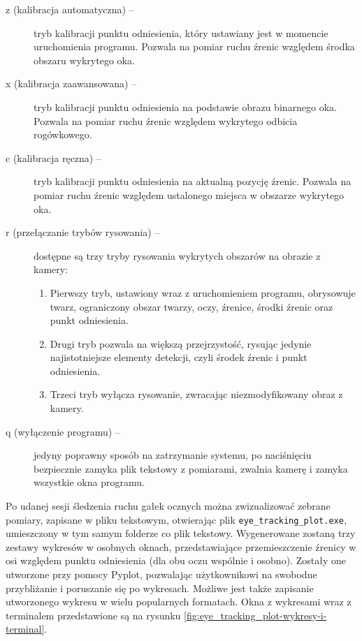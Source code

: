 \documentclass[a4paper,twoside,12pt]{book}
\begin{document}
\begin{description}
	\item[z (kalibracja automatyczna) --]  tryb kalibracji punktu odniesienia, który ustawiany jest w momencie uruchomienia programu. Pozwala na pomiar ruchu źrenic względem środka obszaru wykrytego oka.
	\item[x (kalibracja zaawansowana) --]  tryb kalibracji punktu odniesienia na podstawie obrazu binarnego oka. Pozwala na pomiar ruchu źrenic względem wykrytego odbicia rogówkowego.
	\item[c (kalibracja ręczna) --]  tryb kalibracji punktu odniesienia na aktualną pozycję źrenic. Pozwala na pomiar ruchu źrenic względem ustalonego miejsca w obszarze wykrytego oka.
	\item[r (przełączanie trybów rysowania) --] dostępne są trzy tryby rysowania wykrytych obszarów na obrazie z kamery:
	\begin{enumerate}
		\item Pierwszy tryb, ustawiony wraz z uruchomieniem programu, obrysowuje twarz, ograniczony obszar twarzy, oczy, źrenice, środki źrenic oraz punkt odniesienia.
		\item Drugi tryb pozwala na większą przejrzystość, rysując jedynie najistotniejsze elementy detekcji, czyli środek źrenic i punkt odniesienia.
		\item Trzeci tryb wyłącza rysowanie, zwracając niezmodyfikowany obraz z kamery.
	\end{enumerate}
	\item[q (wyłączenie programu) --] jedyny poprawny sposób na zatrzymanie systemu, po naciśnięciu bezpiecznie zamyka plik tekstowy z pomiarami, zwalnia kamerę i zamyka wszystkie okna programu.
\end{description}

Po udanej sesji śledzenia ruchu gałek ocznych można zwizualizować zebrane pomiary, zapisane w pliku tekstowym, otwierając plik \texttt{eye\_\-tracking\_\-plot.exe},  umieszczony w tym
samym folderze co plik tekstowy. Wygenerowane zostaną trzy zestawy wykresów w osobnych
oknach, przedstawiające przemieszczenie źrenicy w osi względem punktu odniesienia
(dla obu oczu wspólnie i osobno). Zostały one utworzone przy pomocy Pyplot, pozwalając
użytkownikowi na swobodne przybliżanie i poruszanie się po wykresach. Możliwe
jest także zapisanie utworzonego wykresu w wielu popularnych formatach. Okna z
wykresami wraz z terminalem przedstawione są na rysunku \ref{fig:eye_tracking_plot-wykresy-i-terminal}.
\end{document}
